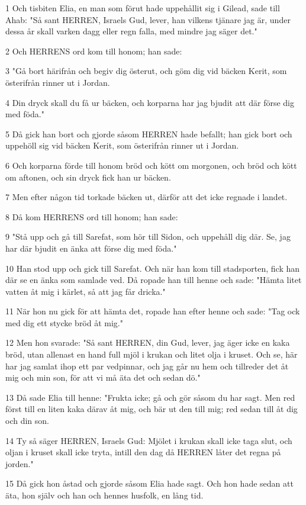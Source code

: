 \par 1 Och tisbiten Elia, en man som förut hade uppehållit sig i Gilead, sade till Ahab: "Så sant HERREN, Israels Gud, lever, han vilkens tjänare jag är, under dessa år skall varken dagg eller regn falla, med mindre jag säger det."
\par 2 Och HERRENS ord kom till honom; han sade:
\par 3 "Gå bort härifrån och begiv dig österut, och göm dig vid bäcken Kerit, som österifrån rinner ut i Jordan.
\par 4 Din dryck skall du få ur bäcken, och korparna har jag bjudit att där förse dig med föda."
\par 5 Då gick han bort och gjorde såsom HERREN hade befallt; han gick bort och uppehöll sig vid bäcken Kerit, som österifrån rinner ut i Jordan.
\par 6 Och korparna förde till honom bröd och kött om morgonen, och bröd och kött om aftonen, och sin dryck fick han ur bäcken.
\par 7 Men efter någon tid torkade bäcken ut, därför att det icke regnade i landet.
\par 8 Då kom HERRENS ord till honom; han sade:
\par 9 "Stå upp och gå till Sarefat, som hör till Sidon, och uppehåll dig där. Se, jag har där bjudit en änka att förse dig med föda."
\par 10 Han stod upp och gick till Sarefat. Och när han kom till stadsporten, fick han där se en änka som samlade ved. Då ropade han till henne och sade: "Hämta litet vatten åt mig i kärlet, så att jag får dricka."
\par 11 När hon nu gick för att hämta det, ropade han efter henne och sade: "Tag ock med dig ett stycke bröd åt mig."
\par 12 Men hon svarade: "Så sant HERREN, din Gud, lever, jag äger icke en kaka bröd, utan allenast en hand full mjöl i krukan och litet olja i kruset. Och se, här har jag samlat ihop ett par vedpinnar, och jag går nu hem och tillreder det åt mig och min son, för att vi må äta det och sedan dö."
\par 13 Då sade Elia till henne: "Frukta icke; gå och gör såsom du har sagt. Men red först till en liten kaka därav åt mig, och bär ut den till mig; red sedan till åt dig och din son.
\par 14 Ty så säger HERREN, Israels Gud: Mjölet i krukan skall icke taga slut, och oljan i kruset skall icke tryta, intill den dag då HERREN låter det regna på jorden."
\par 15 Då gick hon åstad och gjorde såsom Elia hade sagt. Och hon hade sedan att äta, hon själv och han och hennes husfolk, en lång tid.
